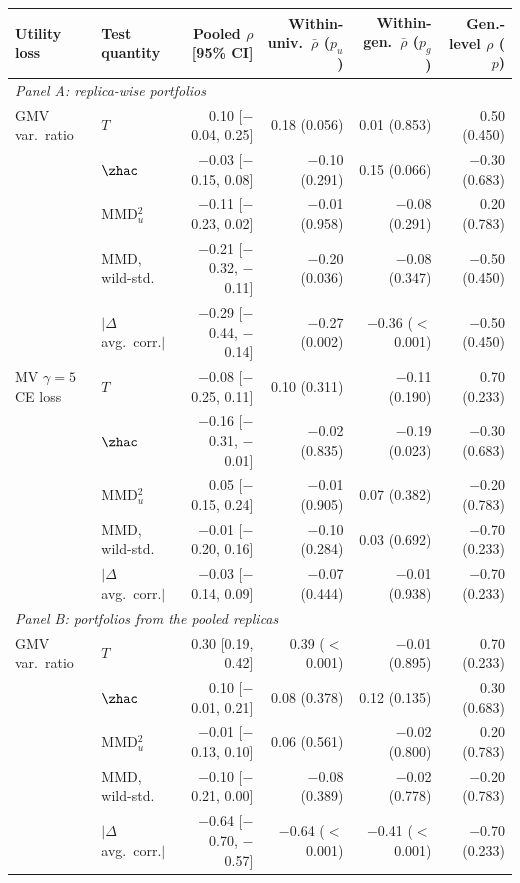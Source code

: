 \begin{tabular}{llrrrr}
\toprule
Utility loss & Test quantity & Pooled $\rho$ [95\% CI] & Within-univ.\ $\bar\rho$ ($p_u$) & Within-gen.\ $\bar\rho$ ($p_g$) & Gen.-level $\rho$ ($p$) \\
\midrule
\multicolumn{6}{l}{\emph{Panel A: replica-wise portfolios}} \\
GMV var.\ ratio & \WC{} $T$ & 0.10 [$-$0.04, 0.25] & 0.18 (0.056) & 0.01 (0.853) & 0.50 (0.450) \\
 & \WC{} $\zhac$ & $-$0.03 [$-$0.15, 0.08] & $-$0.10 (0.291) & 0.15 (0.066) & $-$0.30 (0.683) \\
 & MMD$^2_u$ & $-$0.11 [$-$0.23, 0.02] & $-$0.01 (0.958) & $-$0.08 (0.291) & 0.20 (0.783) \\
 & MMD, wild-std. & $-$0.21 [$-$0.32, $-$0.11] & $-$0.20 (0.036) & $-$0.08 (0.347) & $-$0.50 (0.450) \\
 & $|\Delta$ avg.\ corr.$|$ & $-$0.29 [$-$0.44, $-$0.14] & $-$0.27 (0.002) & $-$0.36 ($<$0.001) & $-$0.50 (0.450) \\
MV $\gamma=5$ CE loss & \WC{} $T$ & $-$0.08 [$-$0.25, 0.11] & 0.10 (0.311) & $-$0.11 (0.190) & 0.70 (0.233) \\
 & \WC{} $\zhac$ & $-$0.16 [$-$0.31, $-$0.01] & $-$0.02 (0.835) & $-$0.19 (0.023) & $-$0.30 (0.683) \\
 & MMD$^2_u$ & 0.05 [$-$0.15, 0.24] & $-$0.01 (0.905) & 0.07 (0.382) & $-$0.20 (0.783) \\
 & MMD, wild-std. & $-$0.01 [$-$0.20, 0.16] & $-$0.10 (0.284) & 0.03 (0.692) & $-$0.70 (0.233) \\
 & $|\Delta$ avg.\ corr.$|$ & $-$0.03 [$-$0.14, 0.09] & $-$0.07 (0.444) & $-$0.01 (0.938) & $-$0.70 (0.233) \\
\midrule
\multicolumn{6}{l}{\emph{Panel B: portfolios from the pooled replicas}} \\
GMV var.\ ratio & \WC{} $T$ & 0.30 [0.19, 0.42] & 0.39 ($<$0.001) & $-$0.01 (0.895) & 0.70 (0.233) \\
 & \WC{} $\zhac$ & 0.10 [$-$0.01, 0.21] & 0.08 (0.378) & 0.12 (0.135) & 0.30 (0.683) \\
 & MMD$^2_u$ & $-$0.01 [$-$0.13, 0.10] & 0.06 (0.561) & $-$0.02 (0.800) & 0.20 (0.783) \\
 & MMD, wild-std. & $-$0.10 [$-$0.21, 0.00] & $-$0.08 (0.389) & $-$0.02 (0.778) & $-$0.20 (0.783) \\
 & $|\Delta$ avg.\ corr.$|$ & $-$0.64 [$-$0.70, $-$0.57] & $-$0.64 ($<$0.001) & $-$0.41 ($<$0.001) & $-$0.70 (0.233) \\
\bottomrule
\end{tabular}

